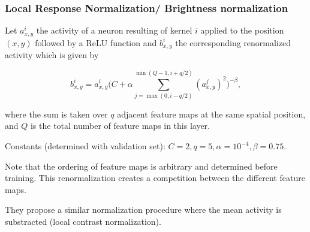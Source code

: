 \begin{frame}
	\frametitle{Local Response Normalization/ Brightness normalization}



	Let $a_{x,y}^i$ the activity of a neuron resulting of kernel $i$ applied to the position $(x,y)$ followed by a ReLU function and $b_{x,y}^i$ the corresponding renormalized activity which is given by

	$$
	b_{x,y}^i = a_{x,y}^i \Bigg( C + \alpha \sum_{j = \max(0, i - q/2)}^{\min(Q-1, i + q/2)} (a_{x,y}^j )^2 \Bigg)^{-\beta},
	$$

	\smallskip

	where the sum is taken over $q$ adjacent feature maps at the same spatial position, and $Q$ is the total number of feature maps in this layer.

	\smallskip

	Constants (determined with validation set): $C=2, q=5, \alpha = 10^{-4}, \beta = 0.75$.

	\bigskip

	Note that the ordering of feature maps is arbitrary and determined before training. This renormalization creates a competition between the different feature maps.

	\bigskip

	\smallskip

	They propose a similar normalization procedure where the mean activity is substracted (local contrast normalization).

\end{frame}

